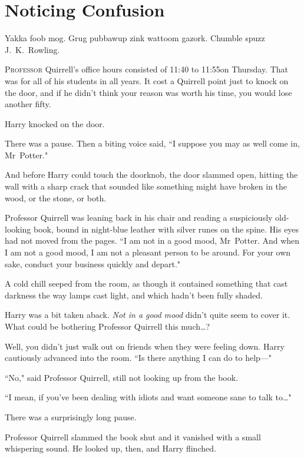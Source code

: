 \chapter{Noticing Confusion}

\begin{chapterOpeningAuthorNote}
Yakka foob mog. Grug pubbawup zink wattoom gazork. Chumble spuzz J.~K.~Rowling.
\end{chapterOpeningAuthorNote}

\lettrine{P}{rofessor} Quirrell's office hours consisted of 11:40 to 11:55\am on Thursday. That was for all of his students in all years. It cost a Quirrell point just to knock on the door, and if he didn't think your reason was worth his time, you would lose another fifty.

Harry knocked on the door.

There was a pause. Then a biting voice said, ``I suppose you may as well come in, Mr~Potter."

And before Harry could touch the doorknob, the door slammed open, hitting the wall with a sharp crack that sounded like something might have broken in the wood, or the stone, or both.

Professor Quirrell was leaning back in his chair and reading a suspiciously old-looking book, bound in night-blue leather with silver runes on the spine. His eyes had not moved from the pages. ``I am not in a good mood, Mr~Potter. And when I am not a good mood, I am not a pleasant person to be around. For your own sake, conduct your business quickly and depart."

A cold chill seeped from the room, as though it contained something that cast darkness the way lamps cast light, and which hadn't been fully shaded.

Harry was a bit taken aback. \emph{Not in a good mood} didn't quite seem to cover it. What could be bothering Professor Quirrell this much{\ldots}?

Well, you didn't just walk out on friends when they were feeling down. Harry cautiously advanced into the room. ``Is there anything I can do to help—"

``No," said Professor Quirrell, still not looking up from the book.

``I mean, if you've been dealing with idiots and want someone sane to talk to{\ldots}"

There was a surprisingly long pause.

Professor Quirrell slammed the book shut and it vanished with a small whispering sound. He looked up, then, and Harry flinched.

